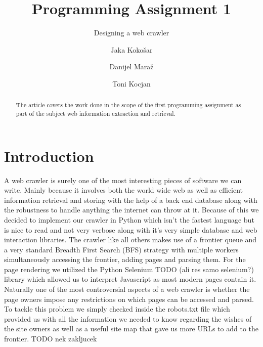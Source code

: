 \documentclass[runningheads]{llncs}
\begin{document}
\title{Programming Assignment 1}
\subtitle{Designing a web crawler}

\author{
  Jaka Kokošar
  \and
  Danijel Maraž
  \and
  Toni Kocjan
}



\maketitle             

\begin{abstract}
The article covers the work done in the scope of the first programming assignment as part of the subject web information extraction and retrieval. 

\end{abstract}

\section{Introduction}
A web crawler is surely one of the most interesting pieces of software we can write. Mainly because it involves both the world wide web as well as efficient information retrieval and storing with the help of a back end database along with the robustness to handle anything the internet can throw at it. Because of this we decided to implement our crawler in Python which isn't the fastest language but is nice to read and not very verbose along with it's very simple database and web interaction libraries. The crawler like all others makes use of a frontier queue and a very standard Breadth First Search (BFS) strategy with multiple workers simultaneously accessing the frontier, adding pages and parsing them. For the page rendering we utilized the Python Selenium TODO (ali res samo selenium?) library which allowed us to interpret Javascript as most modern pages contain it. Naturally one of the most controversial aspects of a web crawler is whether the page owners impose any restrictions on which pages can be accessed and parsed. To tackle this problem we simply checked inside the robots.txt file which provided us with all the information we needed to know regarding the wishes of the site owners as well as a useful site map that gave us more URLs to add to the frontier. TODO nek zakljucek
\end{document}
